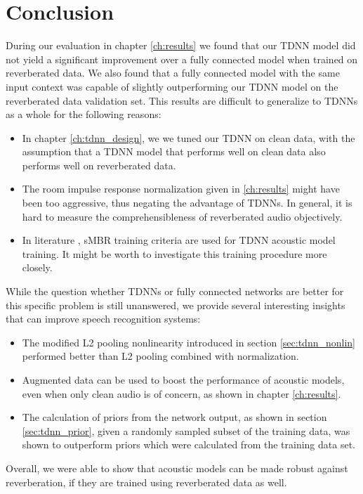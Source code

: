 
\chapter{Conclusion}
\label{ch:Conclusion}
During our evaluation in chapter \ref{ch:results} we found that our TDNN model did not yield a significant improvement over a fully connected model when trained on reverberated data. We also found that a fully connected model with the same input context was capable of slightly outperforming our TDNN model on the reverberated data validation set. This results are difficult to generalize to TDNNs as a whole for the following reasons: 
\begin{itemize}
	\item In chapter \ref{ch:tdnn_design}, we we tuned our TDNN on clean data, with the assumption that a TDNN model that performs well on clean data also performs well on reverberated data. 
	\item The room impulse response normalization given in \ref{ch:results} might have been too aggressive, thus negating the advantage of TDNNs. In general, it is hard to measure the comprehensibleness of reverberated audio objectively.  
	\item In literature \cite{peddinti2015jhu} \cite{peddinti2015reverberation}, sMBR training criteria are used for TDNN acoustic model training. It might be worth to investigate this training procedure more closely.  
\end{itemize}
While the question whether TDNNs or fully connected networks are better for this specific problem is still unanswered, we provide several interesting insights that can improve speech recognition systems:
\begin{itemize}
	\item The modified L2 pooling nonlinearity introduced in section \ref{sec:tdnn_nonlin} performed better than L2 pooling combined with normalization.
	\item Augmented data can be used to boost the performance of acoustic models, even when only clean audio is of concern, as shown in chapter \ref{ch:results}.
	\item The calculation of priors from the network output, as shown in section \ref{sec:tdnn_prior}, given a randomly sampled subset of the training data, was shown to outperform priors which were calculated from the training data set. 
\end{itemize}
Overall, we were able to show that acoustic models can be made robust against reverberation, if they are trained using reverberated data as well.